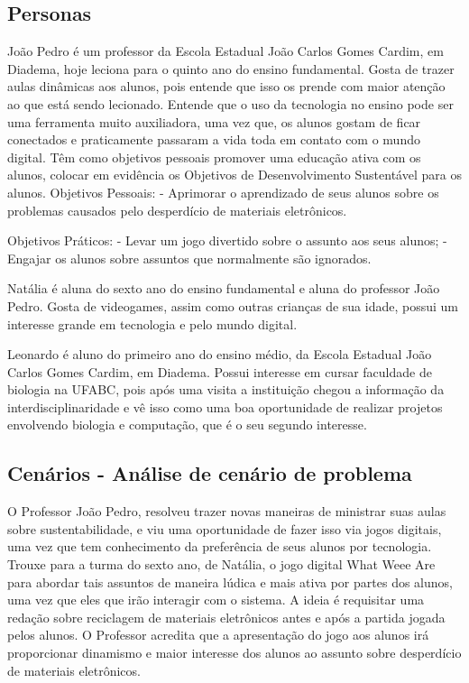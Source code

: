 \subsection{Personas}
João Pedro é um professor da Escola Estadual João Carlos Gomes Cardim, em Diadema, hoje leciona para o quinto ano do ensino fundamental. Gosta de trazer aulas dinâmicas aos alunos, pois entende que isso os prende com maior atenção ao que está sendo lecionado. Entende que o uso da tecnologia no ensino pode ser uma ferramenta muito auxiliadora, uma vez que, os alunos gostam de ficar conectados e praticamente passaram a vida toda em contato com o mundo digital.
Têm como objetivos pessoais promover uma educação ativa com os alunos, colocar em evidência os Objetivos de Desenvolvimento Sustentável para os alunos.
Objetivos Pessoais: 
- Aprimorar o aprendizado de seus alunos sobre os problemas causados pelo desperdício de materiais eletrônicos.

Objetivos Práticos:
- Levar um jogo divertido sobre o assunto aos seus alunos;
- Engajar os alunos sobre assuntos que normalmente são ignorados.


Natália é aluna do sexto ano do ensino fundamental e aluna do professor João Pedro. Gosta de videogames, assim como outras crianças de sua idade, possui um interesse grande em tecnologia e pelo mundo digital.

Leonardo é aluno do primeiro ano do ensino médio, da Escola Estadual João Carlos Gomes Cardim, em Diadema. Possui interesse em cursar faculdade de biologia na UFABC, pois após uma visita a instituição chegou a informação da interdisciplinaridade e vê isso como uma boa oportunidade de realizar projetos envolvendo biologia e computação, que é o seu segundo interesse.

\subsection{Cenários - Análise de cenário de problema}
\label{cenarios}
O Professor João Pedro, resolveu trazer novas maneiras de ministrar suas aulas sobre sustentabilidade, e viu uma oportunidade de fazer isso via jogos digitais, uma vez que tem conhecimento da preferência de seus alunos por tecnologia. Trouxe para a turma do sexto ano, de Natália, o jogo digital What Weee Are para abordar tais assuntos de maneira lúdica e mais ativa por partes dos alunos, uma vez que eles que irão interagir com o sistema. A ideia é requisitar uma redação sobre reciclagem de materiais eletrônicos antes e após a partida jogada pelos alunos. O Professor acredita que a apresentação do jogo aos alunos irá proporcionar dinamismo e maior interesse dos alunos ao assunto sobre desperdício de materiais eletrônicos.

